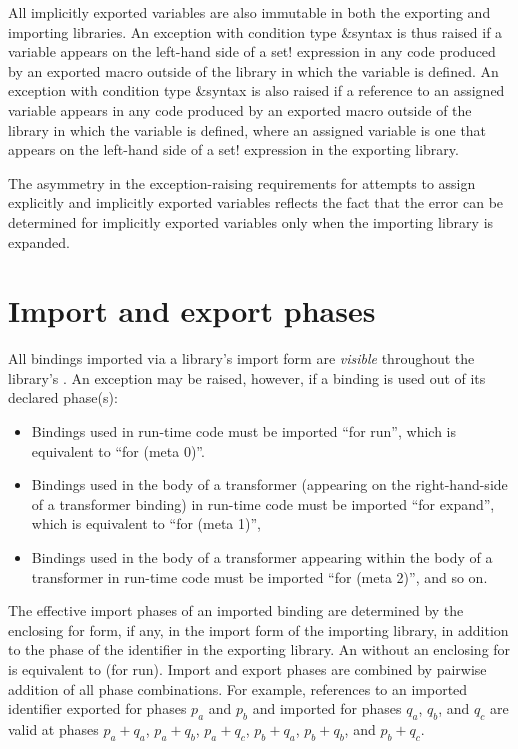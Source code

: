 All implicitly exported variables are also immutable in both the
exporting and importing libraries.
An exception with condition type {\cf\&syntax} is thus raised if a
variable appears on the left-hand side of a {\cf set!}
expression in any code produced by an exported macro outside of the
library in which the variable is defined.
An exception with condition type {\cf\&syntax} is also raised if a
reference to an assigned variable appears in any code produced by
an exported macro outside of the library in which the variable is defined,
where an assigned variable is one that appears on the left-hand
side of a {\cf set!} expression in the exporting library.

\begin{note}
The asymmetry in the exception-raising requirements for attempts to assign
explicitly and implicitly exported variables reflects the fact that the
error can be determined for implicitly exported variables only when the
importing library is expanded.
\end{note}

\section{Import and export phases}
\label{phasessection}

All bindings imported via a library's {\cf import} form are
\emph{visible} throughout the library's .
An exception may be raised, however, if a binding is used out of its declared
phase(s):

\begin{itemize}
\item Bindings used in run-time code must be imported ``for {\cf run}'',
which is equivalent to ``for {\cf (meta 0)}''.
\item Bindings used in the body of a transformer (appearing on the
right-hand-side of a transformer binding) in run-time code must be
imported ``for {\cf expand}'', which is equivalent to
``for {\cf (meta 1)}'',
\item Bindings used in the body of a transformer appearing within the body of a
transformer in run-time code must be imported ``for {\cf (meta 2)}'',
and so on.
\end{itemize}

The effective import phases of an imported binding are determined by the enclosing
{\cf for} form, if any, in the {\cf import} form of the importing
library, in addition to the phase of the identifier in the exporting library.
An  without an enclosing {\cf for} is equivalent to
{\cf (for  run)}.
Import and export phases are combined by pairwise addition of all phase
combinations.  For example, references to an imported identifier exported
for phases $p_a$ and $p_b$ and imported for phases $q_a$, $q_b$, and $q_c$
are valid at phases $p_a+q_a$, $p_a+q_b$, $p_a+q_c$, $p_b+q_a$, $p_b+q_b$,
and $p_b+q_c$.

